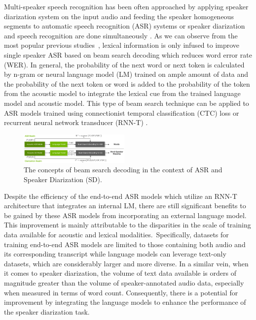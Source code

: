 \documentclass{article}
\begin{document}
Multi-speaker speech recognition has been often approached by applying speaker diarization system on the input audio and feeding the speaker homogeneous segments \cite{park2022review} to automatic speech recognition (ASR) systems \cite{medennikov2020target,cornell2023chime} or speaker diarization and speech recognition are done simultaneously \cite{shafey2019joint, kanda2022transcribe}. As we can observe from the most popular previous studies~\cite{park2022review}, lexical information is only infused to improve single speaker ASR based on beam search decoding \cite{ney1987data,scheidl2018word} which reduces word error rate (WER). In general, the probability of the next word or next token is calculated by n-gram or neural language model (LM) trained on ample amount of data and the probability of the next token or word is added to the probability of the token from the acoustic model to integrate the lexical cue from the trained language model and acoustic model. This type of beam search technique can be applied  to ASR models trained using connectionist temporal classification (CTC) loss \cite{graves2006connectionist} or recurrent neural network transducer (RNN-T) \cite{graves2012sequence}. 
\begin{figure}[t]
\centering
\includegraphics[width=0.48\textwidth]{pics/bsd_two_worlds.png}
\caption{The concepts of beam search decoding in the context of ASR and Speaker Diarization (SD).}
\label{fig:bsd_two_worlds}
\vspace{-4px}
\end{figure}

Despite the efficiency of the end-to-end ASR models which utilize an RNN-T architecture that integrates an internal LM, there are still significant benefits to be gained by these ASR models from incorporating an external language model. This improvement is mainly attributable to the disparities in the scale of training data available for acoustic and lexical modalities.~Specifically, datasets for training end-to-end ASR models are limited to those containing both audio and its corresponding transcript while language models can leverage text-only datasets, which are considerably larger and more diverse. In a similar vein, when it comes to speaker diarization, the volume of text data available is orders of magnitude greater than the volume of speaker-annotated audio data, especially when measured in terms of word count. Consequently, there is a potential for improvement by integrating the language models to enhance the performance of the speaker diarization task. 
\end{document}
